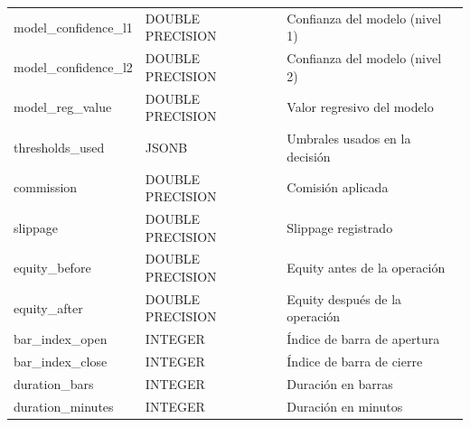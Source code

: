 \begin{longtable}{l l l}
model\_confidence\_l1  & DOUBLE PRECISION  & Confianza del modelo (nivel 1) \\
model\_confidence\_l2  & DOUBLE PRECISION  & Confianza del modelo (nivel 2) \\
model\_reg\_value      & DOUBLE PRECISION  & Valor regresivo del modelo \\
thresholds\_used       & JSONB             & Umbrales usados en la decisión \\
commission             & DOUBLE PRECISION  & Comisión aplicada \\
slippage               & DOUBLE PRECISION  & Slippage registrado \\
equity\_before         & DOUBLE PRECISION  & Equity antes de la operación \\
equity\_after          & DOUBLE PRECISION  & Equity después de la operación \\
bar\_index\_open       & INTEGER           & Índice de barra de apertura \\
bar\_index\_close      & INTEGER           & Índice de barra de cierre \\
duration\_bars         & INTEGER           & Duración en barras \\
duration\_minutes      & INTEGER           & Duración en minutos \\
\end{longtable}
